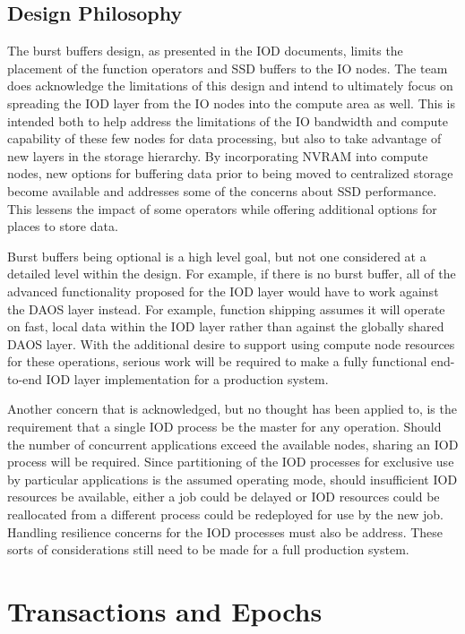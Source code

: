 \documentclass[conference]{IEEEtran}
\begin{document}
\subsection{Design Philosophy}
The burst buffers design, as presented in the IOD documents, limits the
placement of the function operators and SSD buffers to the IO nodes. The team
does acknowledge the limitations of this design and intend to ultimately focus
on spreading the IOD layer from the IO nodes into the compute area as well.
This is intended both to help address the limitations of the IO bandwidth and
compute capability of these few nodes for data processing, but also to take
advantage of new layers in the storage hierarchy. By incorporating NVRAM into
compute nodes, new options for buffering data prior to being moved to
centralized storage become available and addresses some of the concerns about
SSD performance. This lessens the impact of some operators while offering
additional options for places to store data.

Burst buffers being optional is a high level goal, but not one considered at a
detailed level within the design. For example, if there is no burst buffer, all
of the advanced functionality proposed for the IOD layer would have to work
against the DAOS layer instead. For example, function shipping assumes it will
operate on fast, local data within the IOD layer rather than against the
globally shared DAOS layer. With the additional desire to support using compute
node resources for these operations, serious work will be required to make a
fully functional end-to-end IOD layer implementation for a production system.

Another concern that is acknowledged, but no thought has been applied to, is
the requirement that a single IOD process be the master for any operation.
Should the number of concurrent applications exceed the available nodes,
sharing an IOD process will be required. Since partitioning of the IOD
processes for exclusive use by particular applications is the assumed operating
mode, should insufficient IOD resources be available, either a job could be
delayed or IOD resources could be reallocated from a different process could be
redeployed for use by the new job. Handling resilience concerns for the IOD
processes must also be address. These sorts of considerations still need to be
made for a full production system.

\section{Transactions and Epochs}
\label{sec:transactions}
\end{document}
